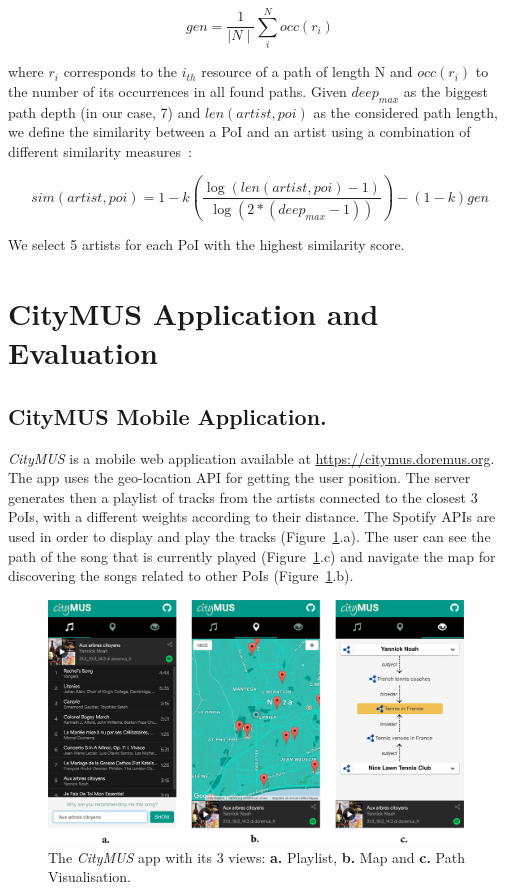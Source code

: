 \documentclass{llncs}
\newcommand\figref{Figure~\ref}
\begin{document}
$$gen =\frac{1}{\mid N \mid}\sum_i^Nocc(r_{i})$$

where $r_{i}$ corresponds to the $i_{th}$ resource of a path of length N and $occ(r_{i})$ to the number of its occurrences in all found paths. Given $deep_{max}$ as the biggest path depth (in our case, 7) and $len(artist,poi)$ as the considered path length, we define the similarity between a PoI and an artist using a combination of different similarity measures~\cite{meng2013review}:

$$sim(artist,poi) = 1-k(\frac{\log(len(artist,poi)-1)}{\log(2*(deep_{max} -1))})-(1-k)gen$$

We select 5 artists for each PoI with the highest similarity score.


\section{CityMUS Application and Evaluation}
\label{sec:CityMUS}

\subsection*{CityMUS Mobile Application.}
\textit{CityMUS} is a mobile web application available at \url{https://citymus.doremus.org}. The app uses the geo-location API for getting the user position. The server generates then a playlist of tracks from the artists connected to the closest 3 PoIs, with a different weights according to their distance. The Spotify APIs are used in order to display and play the tracks (\figref{fig:screenshots}.a). The user can see the path of the song that is currently played (\figref{fig:screenshots}.c) and navigate the map for discovering the songs related to other PoIs (\figref{fig:screenshots}.b).

\begin{figure}
 \centerline{
 \includegraphics[width=11cm]{img/screenshots.png}}
 \caption{The \textit{CityMUS} app with its 3 views: \textbf{a.} Playlist, \textbf{b.} Map and \textbf{c.} Path Visualisation.}
 \label{fig:screenshots}
\end{figure}
\end{document}
